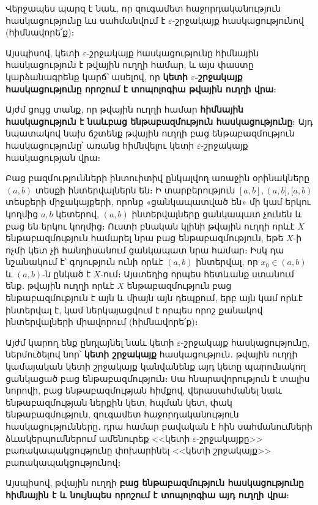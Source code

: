 \documentclass[./main.tex]{subfiles}
\begin{document}
Վերջապես պարզ է նաև, որ զուգամետ հաջորդականություն հասկացությունը ևս սահմանվում է $\varepsilon$-շրջակայք հասկացությունով (հիմնավորե՛ք)։

\par Այսպիսով, կետի $\varepsilon$-շրջակայք հասկացությունը հիմնային հասկացություն է թվա\-յին ուղղի համար, և այս փաստը կարձանագրենք կարճ՝ ասելով, որ \textbf{կետի $\varepsilon$-շրջա\-կայք հասկացությունը որոշում է տոպոլոգիա թվային ուղղի վրա}։

\par Այժմ ցույց տանք, որ թվային ուղղի համար \textbf{հիմնային հասկացություն է նաև\linebreak բաց ենթաբազմություն հասկացությունը}։ Այդ նպատակով նախ ճշտենք թվային ուղղի բաց ենթաբազմություն հասկացությունը՝ առանց հիմնվելու կետի $\varepsilon$-շրջա\-կայք հաս\-կացության վրա։

\par Բաց բազմությունների ինտուիտիվ ընկալվող առաջին օրինակները $(a,b)$ տեսքի ինտերվալներն են։ Ի տարբերություն $[a,b], (a,b], [a,b)$ տեսքերի միջակայքերի, որոնք «ցանկապատված են» մի կամ երկու կողմից $a,b$ կետերով, $(a,b)$ ինտերվալները ցանկապատ չունեն և բաց են երկու կողմից։ Ուստի բնական կլինի թվային ուղղի որևէ $X$ ենթաբազմություն համարել նրա բաց ենթաբազմություն, եթե $X$-ի ոչմի կետ չի հանդիսանում ցանկապատ նրա համար։ Իսկ դա նշանակում է՝ գոյություն ունի որևէ $(a,b)$ ինտերվալ, որ $x_0 \in (a,b)$ և $(a,b)$-ն ընկած է $X$-ում։ Այստեղից որպես հետևանք ստանում ենք․ թվային ուղղի որևէ $X$ ենթաբազմություն բաց ենթաբազմություն է այն և միայն այն դեպքում, երբ այն կամ որևէ ինտերվալ է, կամ ներկայացվում է որպես որոշ քանակով ինտերվալների միավորում (հիմնավորե՛ք)։

\par Այժմ կարող ենք ընդլայնել նաև կետի $\varepsilon$-շրջակայք հասկացությունը, ներմու\-ծե\-լով նոր՝ \textbf{կետի շրջակայք} հասկացություն․ թվային ուղղի կամայական կետի շրջա\-կայք կանվանենք այդ կետը պարունակող ցանկացած բաց ենթաբազմություն։ Սա հնա\-րա\-վորություն է տալիս նորովի, բաց ենթաբազմության հիմքով, վերա\-սահ\-մանել նաև ենթաբազմության ներքին կետ, հպման կետ, փակ ենթաբազմություն, զուգա\-մետ հաջորդականություն հասկացությունները․ դրա համար բավական է հին սահ\-մա\-նում\-ների ձևակերպումներում ամենուրեք <<կետի $\varepsilon$-շրջակայքը>> բառակապակցությունը փոխարինել <<կետի շրջակայք>> բառակապակցությունով։

\par Այսպիսով, թվային ուղղի \textbf{բաց ենթաբազմություն հասկացությունը հիմնային է և նույնպես որոշում է տոպոլոգիա այդ ուղղի վրա}։
\end{document}
